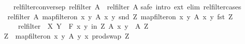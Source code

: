 \begin{isabellebody}
\ \ \isamarkupfalse%
\isanewline
{}\isamarkupfalse%
%
\endisatagproof
{\isafoldproof}%
%
\isadelimproof
\isanewline
%
\endisadelimproof
\isanewline
{}\isamarkupfalse%
\ rel{\isacharunderscore}{\kern0pt}filter{\isacharunderscore}{\kern0pt}conversep{\isacharcolon}{\kern0pt}\ {\isachardoublequoteopen}rel{\isacharunderscore}{\kern0pt}filter\ A{\isasyminverse}{\isasyminverse}\ {\isacharequal}{\kern0pt}\ {\isacharparenleft}{\kern0pt}rel{\isacharunderscore}{\kern0pt}filter\ A{\isacharparenright}{\kern0pt}{\isasyminverse}{\isasyminverse}{\isachardoublequoteclose}\isanewline
%
\isadelimproof
%
\endisadelimproof
%
\isatagproof
{}\isamarkupfalse%
{\isacharparenleft}{\kern0pt}safe\ intro{\isacharbang}{\kern0pt}{\isacharcolon}{\kern0pt}\ ext\ elim{\isacharbang}{\kern0pt}{\isacharcolon}{\kern0pt}\ rel{\isacharunderscore}{\kern0pt}filter{\isachardot}{\kern0pt}cases{\isacharparenright}{\kern0pt}\isanewline
\ \ \isamarkupfalse%
\ {\isacharasterisk}{\kern0pt}{\isacharcolon}{\kern0pt}\ {\isachardoublequoteopen}rel{\isacharunderscore}{\kern0pt}filter\ A\ {\isacharparenleft}{\kern0pt}map{\isacharunderscore}{\kern0pt}filter{\isacharunderscore}{\kern0pt}on\ {\isacharbraceleft}{\kern0pt}{\isacharparenleft}{\kern0pt}x{\isacharcomma}{\kern0pt}\ y{\isacharparenright}{\kern0pt}{\isachardot}{\kern0pt}\ A{\isasyminverse}{\isasyminverse}\ x\ y{\isacharbraceright}{\kern0pt}\ snd\ Z{\isacharparenright}{\kern0pt}\ {\isacharparenleft}{\kern0pt}map{\isacharunderscore}{\kern0pt}filter{\isacharunderscore}{\kern0pt}on\ {\isacharbraceleft}{\kern0pt}{\isacharparenleft}{\kern0pt}x{\isacharcomma}{\kern0pt}\ y{\isacharparenright}{\kern0pt}{\isachardot}{\kern0pt}\ A{\isasyminverse}{\isasyminverse}\ x\ y{\isacharbraceright}{\kern0pt}\ fst\ Z{\isacharparenright}{\kern0pt}{\isachardoublequoteclose}\isanewline
\ \ \ \ {\isacharparenleft}{\kern0pt}\ {\isachardoublequoteopen}rel{\isacharunderscore}{\kern0pt}filter\ {\isacharunderscore}{\kern0pt}\ {\isacharquery}{\kern0pt}X\ {\isacharquery}{\kern0pt}Y{\isachardoublequoteclose}{\isacharparenright}{\kern0pt}\ \ {\isachardoublequoteopen}{\isasymforall}\isactrlsub F\ {\isacharparenleft}{\kern0pt}x{\isacharcomma}{\kern0pt}\ y{\isacharparenright}{\kern0pt}\ in\ Z{\isachardot}{\kern0pt}\ A{\isasyminverse}{\isasyminverse}\ x\ y{\isachardoublequoteclose}\ \ A\ Z\isanewline
\ \ \isamarkupfalse%
\isanewline
\ \ \ \ \isamarkupfalse%
\ {\isacharquery}{\kern0pt}Z\ {\isacharequal}{\kern0pt}\ {\isachardoublequoteopen}map{\isacharunderscore}{\kern0pt}filter{\isacharunderscore}{\kern0pt}on\ {\isacharbraceleft}{\kern0pt}{\isacharparenleft}{\kern0pt}x{\isacharcomma}{\kern0pt}\ y{\isacharparenright}{\kern0pt}{\isachardot}{\kern0pt}\ A\ y\ x{\isacharbraceright}{\kern0pt}\ prod{\isachardot}{\kern0pt}swap\ Z{\isachardoublequoteclose}\isanewline

\end{isabellebody}
